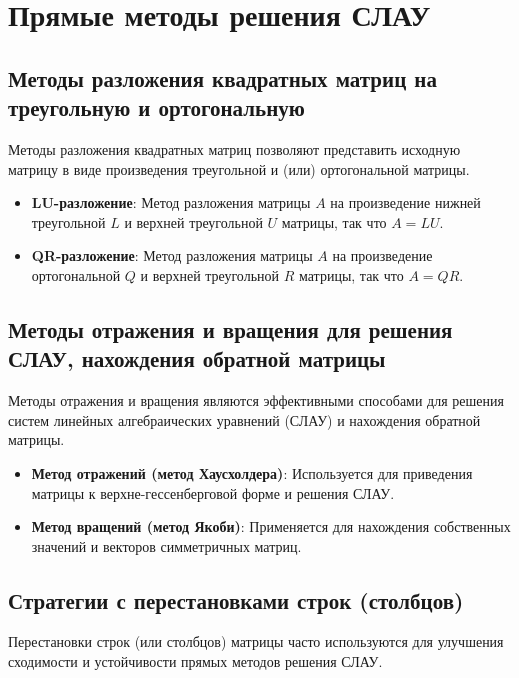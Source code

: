 \documentclass{article}
\begin{document}
\section{Прямые методы решения СЛАУ}

\subsection{Методы разложения квадратных матриц на треугольную и ортогональную}

Методы разложения квадратных матриц позволяют представить исходную матрицу в виде произведения треугольной и (или) ортогональной матрицы.

\begin{itemize}
  \item \textbf{LU-разложение}: Метод разложения матрицы \( A \) на произведение нижней треугольной \( L \) и верхней треугольной \( U \) матрицы, так что \( A = LU \).
  
  \item \textbf{QR-разложение}: Метод разложения матрицы \( A \) на произведение ортогональной \( Q \) и верхней треугольной \( R \) матрицы, так что \( A = QR \).
\end{itemize}

\subsection{Методы отражения и вращения для решения СЛАУ, нахождения обратной матрицы}

Методы отражения и вращения являются эффективными способами для решения систем линейных алгебраических уравнений (СЛАУ) и нахождения обратной матрицы.

\begin{itemize}
  \item \textbf{Метод отражений (метод Хаусхолдера)}: Используется для приведения матрицы к верхне-гессенберговой форме и решения СЛАУ.
  
  \item \textbf{Метод вращений (метод Якоби)}: Применяется для нахождения собственных значений и векторов симметричных матриц.
\end{itemize}

\subsection{Стратегии с перестановками строк (столбцов)}

Перестановки строк (или столбцов) матрицы часто используются для улучшения сходимости и устойчивости прямых методов решения СЛАУ.
\end{document}
